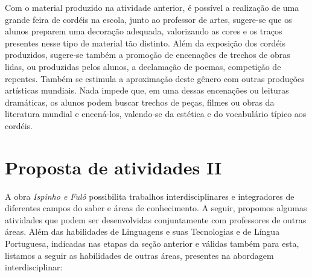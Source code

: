 \documentclass[12pt]{extarticle}
\begin{document}

 Com o material produzido na atividade anterior, é possível a
realização de uma grande feira de cordéis na escola, junto ao professor
de artes, sugere-se que os alunos preparem uma decoração adequada,
valorizando as cores e os traços presentes nesse tipo de material tão
distinto. Além da exposição dos cordéis produzidos, sugere-se também a
promoção de encenações de trechos de obras lidas, ou produzidas pelos
alunos, a declamação de poemas, competição de repentes. Também se
estimula a aproximação deste gênero com outras produções artísticas
mundiais. Nada impede que, em uma dessas encenações ou leituras
dramáticas, os alunos podem buscar trechos de peças, filmes ou obras da
literatura mundial e encená-los, valendo-se da estética e do vocabulário
típico aos cordéis.

\section{Proposta de atividades II}
A obra \emph{Ispinho e Fulô} possibilita trabalhos interdisciplinares e
integradores de diferentes campos do saber e áreas de conhecimento. A
seguir, propomos algumas atividades que podem ser desenvolvidas
conjuntamente com professores de outras áreas. Além das habilidades de
Linguagens e suas Tecnologias e de Língua Portuguesa, indicadas nas
etapas da seção anterior e válidas também para esta, listamos a seguir
as habilidades de outras áreas, presentes na abordagem interdisciplinar:
\end{document}
